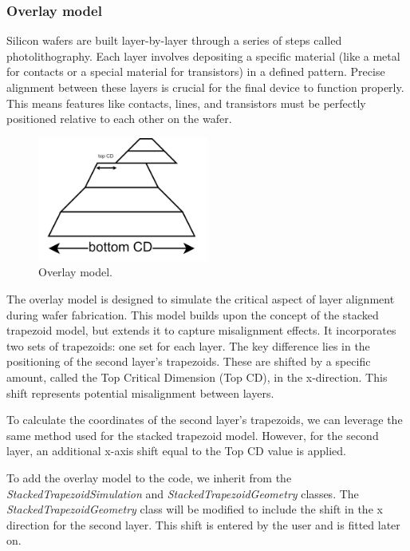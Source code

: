 \subsubsection{Overlay model}

Silicon wafers are built layer-by-layer through a series of steps called photolithography. 
Each layer involves depositing a specific material (like a metal for contacts or a 
special material for transistors) in a defined pattern. Precise alignment between these 
layers is crucial for the final device to function properly. This means features like 
contacts, lines, and transistors must be perfectly positioned relative to each other 
on the wafer.

\medskip

\begin{figure}[h]
    \centering
    \includegraphics[width=0.5\textwidth]{images/overlay.PNG}
    \caption{Overlay model.}
    \label{fig:overlay}
\end{figure}

\FloatBarrier

The overlay model is designed to simulate the critical aspect of layer alignment during wafer 
fabrication. This model builds upon the concept of the stacked trapezoid model, but extends it to 
capture misalignment effects. It incorporates two sets of trapezoids: one set for each layer. The 
key difference lies in the positioning of the second layer's trapezoids. These are shifted by a 
specific amount, called the Top Critical Dimension (Top CD), in the x-direction. This shift 
represents potential misalignment between layers.

\medskip

To calculate the coordinates of the second layer's trapezoids, we can leverage the same method 
used for the stacked trapezoid model. However, for the second layer, an additional x-axis shift 
equal to the Top CD value is applied.

\medskip

To add the overlay model to the code, we inherit from the \textit{StackedTrapezoidSimulation} and \textit{StackedTrapezoidGeometry} classes.
The \textit{StackedTrapezoidGeometry} class will be modified to include the shift in the x direction for the second layer. This shift is entered by the
user and is fitted later on.

